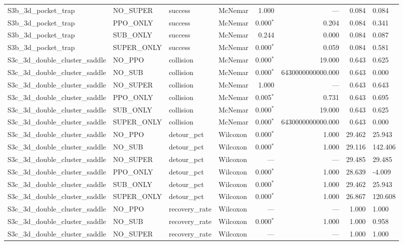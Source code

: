 \begin{tabular}{llllrrrl}
  S3b_3d_pocket_trap & NO_SUPER & success & McNemar & 1.000 & --- & 0.084 & 0.084 \\
  S3b_3d_pocket_trap & PPO_ONLY & success & McNemar & 0.000$^{*}$ & 0.204 & 0.084 & 0.341 \\
  S3b_3d_pocket_trap & SUB_ONLY & success & McNemar & 0.244 & 0.000 & 0.084 & 0.087 \\
  S3b_3d_pocket_trap & SUPER_ONLY & success & McNemar & 0.000$^{*}$ & 0.059 & 0.084 & 0.581 \\
  S3c_3d_double_cluster_saddle & NO_PPO & collision & McNemar & 0.000$^{*}$ & 19.000 & 0.643 & 0.625 \\
  S3c_3d_double_cluster_saddle & NO_SUB & collision & McNemar & 0.000$^{*}$ & 6430000000000.000 & 0.643 & 0.000 \\
  S3c_3d_double_cluster_saddle & NO_SUPER & collision & McNemar & 1.000 & --- & 0.643 & 0.643 \\
  S3c_3d_double_cluster_saddle & PPO_ONLY & collision & McNemar & 0.005$^{*}$ & 0.731 & 0.643 & 0.695 \\
  S3c_3d_double_cluster_saddle & SUB_ONLY & collision & McNemar & 0.000$^{*}$ & 19.000 & 0.643 & 0.625 \\
  S3c_3d_double_cluster_saddle & SUPER_ONLY & collision & McNemar & 0.000$^{*}$ & 6430000000000.000 & 0.643 & 0.000 \\
  S3c_3d_double_cluster_saddle & NO_PPO & detour_pct & Wilcoxon & 0.000$^{*}$ & 1.000 & 29.462 & 25.943 \\
  S3c_3d_double_cluster_saddle & NO_SUB & detour_pct & Wilcoxon & 0.000$^{*}$ & 1.000 & 29.116 & 142.406 \\
  S3c_3d_double_cluster_saddle & NO_SUPER & detour_pct & Wilcoxon & --- & --- & 29.485 & 29.485 \\
  S3c_3d_double_cluster_saddle & PPO_ONLY & detour_pct & Wilcoxon & 0.000$^{*}$ & 1.000 & 28.639 & -4.009 \\
  S3c_3d_double_cluster_saddle & SUB_ONLY & detour_pct & Wilcoxon & 0.000$^{*}$ & 1.000 & 29.462 & 25.943 \\
  S3c_3d_double_cluster_saddle & SUPER_ONLY & detour_pct & Wilcoxon & 0.000$^{*}$ & 1.000 & 26.867 & 120.608 \\
  S3c_3d_double_cluster_saddle & NO_PPO & recovery_rate & Wilcoxon & --- & --- & 1.000 & 1.000 \\
  S3c_3d_double_cluster_saddle & NO_SUB & recovery_rate & Wilcoxon & 0.000$^{*}$ & 1.000 & 1.000 & 0.958 \\
  S3c_3d_double_cluster_saddle & NO_SUPER & recovery_rate & Wilcoxon & --- & --- & 1.000 & 1.000 \\

\end{tabular}
